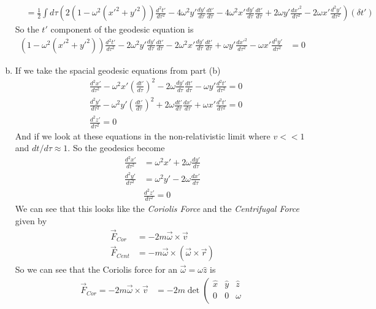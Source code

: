 \documentclass[11pt]{article}
\numberwithin{equation}{section}
\begin{document}
\begin{enumerate}[(a)]
\begin{align*}
&= \frac{1}{2}\int d\tau \left(2\left(1-\omega^2(x'^2+y'^2)\right)\frac{d^2t'}{d\tau^2}  - 4\omega^2y'\frac{dy'}{d\tau}\frac{dt'}{d\tau}  - 4\omega^2x'\frac{dy'}{d\tau}\frac{dt'}{d\tau} + 2\omega y'\frac{dx'^2}{d\tau^2}  -2\omega x'\frac{d^2y'}{d\tau^2} \right)(\delta t')
\end{align*}
So the $t'$ component of the geodesic equation is
\begin{align*}
\left(1-\omega^2(x'^2+y'^2)\right)\frac{d^2t'}{d\tau^2}  - 2\omega^2y'\frac{dy'}{d\tau}\frac{dt'}{d\tau}  - 2\omega^2x'\frac{dy'}{d\tau}\frac{dt'}{d\tau} + \omega y'\frac{dx'^2}{d\tau^2}  -\omega x'\frac{d^2y'}{d\tau^2} &= 0
\end{align*}

\item
If we take the spacial geodesic equations from part (b) 
\begin{align*}
&\frac{d^2x'}{d\tau^2} - \omega^2x'\left(\frac{dt'}{d\tau}\right)^2   - 2\omega\frac{dy'}{d\tau}\frac{dt'}{d\tau}  - \omega y'\frac{d^2t'}{d\tau^2}   = 0\\
&\frac{d^2y'}{d\tau^2}  - \omega^2y'\left(\frac{dt'}{d\tau}\right)^2  +  2\omega\frac{dt'}{d\tau}\frac{dx'}{d\tau}  + \omega x'\frac{d^2t'}{d\tau^2} = 0\\
&\frac{d^2z'}{d\tau^2} = 0
\end{align*}
And if we look at these equations in the non-relativistic limit where $v<<1$ and $dt/d\tau \approx 1$. So the geodesics become
\begin{align*}
\frac{d^2x'}{d\tau^2} &= \omega^2x' + 2\omega\frac{dy'}{d\tau} \\
\frac{d^2y'}{d\tau^2}  &= \omega^2y' -  2\omega\frac{dx'}{d\tau} \\
&\frac{d^2z'}{d\tau^2} = 0
\end{align*}
We can see that this looks like the \emph{Coriolis Force} and the \emph{Centrifugal Force} given by
\begin{align*}
\vec{F}_{Cor} &= -2m\vec{\omega}\times\vec{v}\\
\vec{F}_{Cent} &= -m\vec{\omega}\times(\vec{\omega}\times\vec{r})
\end{align*}
So we can see that the Coriolis force for an $\vec{\omega} = \omega\hat{z}$ is
\begin{align*}
\vec{F}_{Cor} = -2m\vec{\omega}\times\vec{v} &= -2m\det\left(\begin{array}{ccc}
			\hat{x}		&\hat{y}	&\hat{z}\\
			0		&0		&\omega\\

\end{array}
\end{align*}
\end{enumerate}
\end{document}
